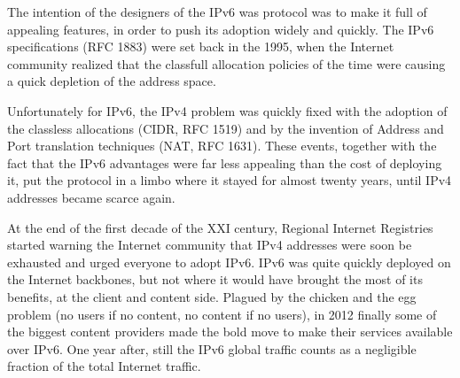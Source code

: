 The intention of the designers of the IPv6 was protocol was to make it full of appealing features, in order to push its adoption widely and quickly. The IPv6 specifications (RFC 1883) were set back in the 1995, when the Internet community realized that the classfull allocation policies of the time were causing a quick depletion of the address space. 
\par
Unfortunately for IPv6, the IPv4 problem was quickly fixed with the adoption of the classless allocations (CIDR, RFC 1519) and by the invention of Address and Port translation techniques (NAT, RFC 1631). These events, together with the fact that the IPv6 advantages were far less appealing than the cost of deploying it, put the protocol in a limbo where it stayed for almost twenty years, until IPv4 addresses became scarce again.
\par
At the end of the first decade of the XXI century, Regional Internet Registries started warning the Internet community that IPv4 addresses were soon be exhausted and urged everyone to adopt IPv6. IPv6 was quite quickly deployed on the Internet backbones, but not where it would have brought the most of its benefits, at the client and content side. 
Plagued by the chicken and the egg problem (no users if no content, no content if no users), in 2012 finally some of the biggest content providers made the bold move to make their services available over IPv6. One year after, still the IPv6 global traffic counts as a negligible fraction of the total Internet traffic.

